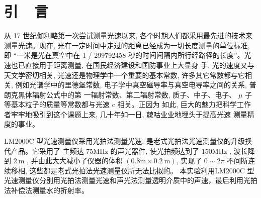 \documentclass{buaaemp}
\begin{document}



\wuhao 

\section{引~~言}
从 17 世纪伽利略第一次尝试测量光速以来, 各个时期人们都采用最先进的技术来测量光速。现在, 光在一定时间中走过的距离已经成为一切长度测量的单位标准, 即 “一米是光在真空中在  1 / 299792458  秒的时间间隔内所行经路径的长度”。光速也已直接用于距离测量, 在国民经济建设和国防事业上大显身 手, 光的速度又与天文学密切相关, 光速还是物理学中一个重要的基本常数, 许多其它常数都与它相关, 例如光谱学中的里德堡常数, 电子学中真空磁导率与真空电导率之间的关系, 普朗克黑体辐射公式中的第 一辐射常数、第二辐射常数, 质子、中子、电子、 $ \mu $ 子等基本粒子的质量等常数都与光速  c  相关。正因为 如此, 巨大的魅力把科学工作者牢牢地吸引到这个课题上来, 几十年如一日, 兢咕业业地埋头于提高光速 测量精度的事业。

LM2000C 型光速测量仪采用光拍法测量光速, 是老式光拍法光速测量仪的升级换代产品。它采用了 主频达 $ 75 \mathrm{MHz} $ 的声光器件, 使光拍频达到了  $150 \mathrm{MHz}$ , 波长降到 $ 2 \mathrm{~m}$ , 并由此大大减小了仪器的体积  $(0.8   \mathrm{m} \times 0.2 \mathrm{~m}  )$, 实现了  $0 \sim 2 \pi $ 不间断连续移相, 这些都是老式光拍法光速测量仪所无法比拟的。\cite{钱建强2016近代物理实验}
本实验利用LM2000C 型光速测量仪分别用光拍法测量光速和声光法测量透明介质中的声速，最后利用光拍法补偿法测量水的折射率。
\end{document}
